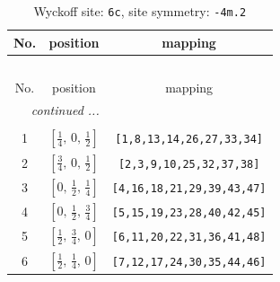 \documentclass[fleqn,8pt]{jsarticle}
\begin{document}
\renewcommand{\arraystretch}{1.2}
\begin{longtable}{ccc}
\caption{Wyckoff site: {\tt 6c}, site symmetry: {\tt -4m.2}}
 \\
 \hline \hline
No. & position & mapping \\ \hline \endfirsthead

\multicolumn{2}{l}{\tablename\ \thetable{}} \\
 \hline \hline
No. & position & mapping \\ \hline \endhead

 \hline \hline
\multicolumn{2}{r}{\footnotesize\it continued ...} \\ \endfoot

 \hline \hline
\multicolumn{2}{r}{} \\ \endlastfoot

1 & $\left[ \frac{1}{4},\, 0,\, \frac{1}{2} \right]$ & {\tt [1,8,13,14,26,27,33,34]} \\ \hline
2 & $\left[ \frac{3}{4},\, 0,\, \frac{1}{2} \right]$ & {\tt [2,3,9,10,25,32,37,38]} \\ \hline
3 & $\left[ 0,\, \frac{1}{2},\, \frac{1}{4} \right]$ & {\tt [4,16,18,21,29,39,43,47]} \\ \hline
4 & $\left[ 0,\, \frac{1}{2},\, \frac{3}{4} \right]$ & {\tt [5,15,19,23,28,40,42,45]} \\ \hline
5 & $\left[ \frac{1}{2},\, \frac{3}{4},\, 0 \right]$ & {\tt [6,11,20,22,31,36,41,48]} \\ \hline
6 & $\left[ \frac{1}{2},\, \frac{1}{4},\, 0 \right]$ & {\tt [7,12,17,24,30,35,44,46]} \\
\end{longtable}
\renewcommand{\arraystretch}{1.2}
\end{document}
